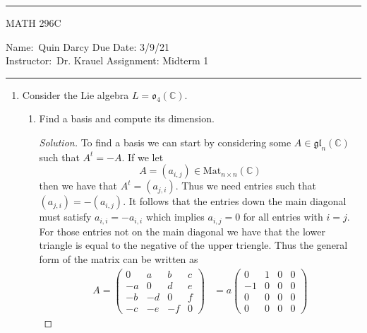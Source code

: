 \documentclass[12pt]{article}
\theoremstyle{definition}
\newenvironment{solution}
{\renewcommand\qedsymbol{$\blacksquare$}\begin{proof}[Solution]}
{\end{proof}}
\begin{document}
    \thispagestyle{empty}\hrule

    \begin{center}
        \vspace{.4cm} { \large MATH 296C}
    \end{center}
    {Name:\ Quin Darcy \hspace{\fill} Due Date: 3/9/21   \\
    { Instructor:}\ Dr. Krauel \hspace{\fill} Assignment:
    Midterm 1 \\ \hrule}

    \begin{enumerate}
        \item Consider the Lie algebra $L=\mathfrak{o}_4(\mathbb{C})$.
            \begin{enumerate}
                \item Find a basis and compute its dimension.
                    \begin{solution}
                        To find a basis we can start by considering some
                        $A\in\mathfrak{gl}_n(\mathbb{C})$ such that $A^t=-A$.
                        If we let 
                            \begin{equation*}
                                A = (a_{i,j})\in\text{Mat}_{n\times n}(\mathbb{C})
                            \end{equation*}
                        then we have that $A^t=(a_{j, i})$. Thus we need
                        entries such that $(a_{j, i})=-(a_{i, j})$. It follows
                        that the entries down the main diagonal must satisfy
                        $a_{i, i}=-a_{i, i}$ which implies $a_{i, j}=0$ for all
                        entries with $i=j$. For those entries not on the main
                        diagonal we have that the lower triangle is equal to
                        the negative of the upper triengle. Thus the general
                        form of the matrix can be written as 
                            \begin{equation*}
                                \begin{split}
                                    A =\begin{pmatrix}0&a&b&c\\-a&0&d&e\\-b&-d&0&f\\-c&-e&-f&0
                                    \end{pmatrix} 
                                    &=a\begin{pmatrix}0&1&0&0\\-1&0&0&0\\0&0&0&0\\0&0&0&0

\end{pmatrix}
\end{split}
\end{equation*}
\end{solution}
\end{enumerate}
\end{enumerate}
\end{document}
